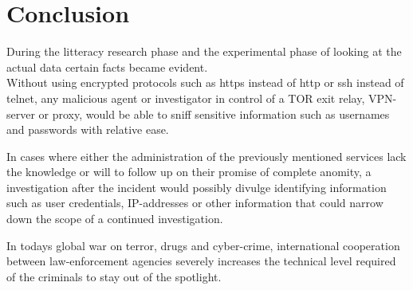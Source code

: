 \section{Conclusion}
\label{sec:conclusion}
%
During the litteracy research phase and the experimental phase of looking at the actual data certain facts became evident. \\

Without using encrypted protocols such as https instead of http or ssh instead of telnet, any malicious agent or investigator in control of a TOR exit relay, VPN-server or proxy, would be able to sniff sensitive information such as usernames and passwords with relative ease. 

In cases where either the administration of the previously mentioned services lack the knowledge or will to follow up on their promise of complete anomity, a investigation after the incident would possibly divulge identifying information such as user credentials, IP-addresses or other information that could narrow down the scope of a continued investigation. 

In todays global war on terror, drugs and cyber-crime, international cooperation between law-enforcement agencies severely increases the technical level required of the criminals to stay out of the spotlight.
